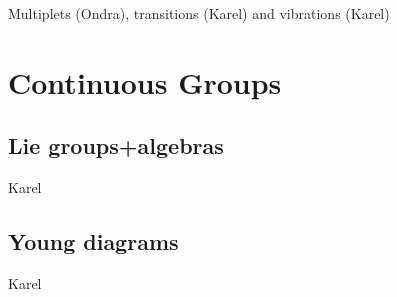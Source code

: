 Multiplets (Ondra), transitions (Karel) and vibrations (Karel)




\chapter{Continuous Groups}

\section{Lie groups+algebras}

Karel

\section{Young diagrams}

Karel
